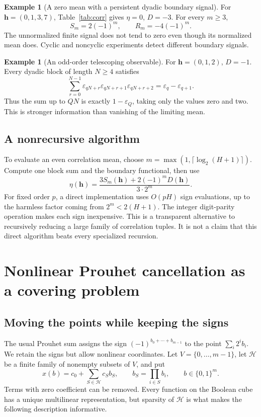 \documentclass[11pt,oneside]{article}
\numberwithin{equation}{section}
\theoremstyle{definition}
\newtheorem{example}[theorem]{Example}
\theoremstyle{remark}
\newcommand{\eps}{\varepsilon}
\newcommand{\HH}{\mathcal H}
\newcommand{\bits}{\{0,1\}}
\begin{document}
\begin{example}[A zero mean with a persistent dyadic boundary signal]
For \(\bm h=(0,1,3,7)\), Table~\ref{tab:corr} gives \(\eta=0\), \(D=-3\).
For every \(m\ge3\),
\[
 S_m=2(-1)^m,\qquad R_m=-4(-1)^m.
\]
The unnormalized finite signal does not tend to zero even though its normalized
mean does. Cyclic and noncyclic experiments detect different boundary signals.
\end{example}

\begin{example}[An odd-order telescoping observable]
For \(\bm h=(0,1,2)\), \(D=-1\). Every dyadic block of length \(N\ge4\)
satisfies
\[
 \sum_{r=0}^{N-1}\eps_{qN+r}\eps_{qN+r+1}\eps_{qN+r+2}
 =\eps_q-\eps_{q+1}.
\]
Thus the sum up to \(QN\) is exactly \(1-\eps_Q\), taking only the values zero
and two. This is stronger information than vanishing of the limiting mean.
\end{example}

\subsection{A nonrecursive algorithm}
To evaluate an even correlation mean, choose
\(m=\max(1,\lceil\log_2(H+1)\rceil)\). Compute one block sum and the
boundary functional, then use
\[
 \eta(\bm h)=\frac{3S_m(\bm h)+2(-1)^mD(\bm h)}{3\cdot2^m}.
\]
For fixed order \(p\), a direct implementation uses \(O(pH)\) sign evaluations,
up to the harmless factor coming from \(2^m<2(H+1)\). The integer digit-parity
operation makes each sign inexpensive. This is a transparent alternative to
recursively reducing a large family of correlation tuples. It is not a claim
that this direct algorithm beats every specialized recursion.

\section{Nonlinear Prouhet cancellation as a covering problem}
\label{sec:hypergraph}

\subsection{Moving the points while keeping the signs}
The usual Prouhet sum assigns the sign \((-1)^{b_0+\cdots+b_{m-1}}\) to the
point \(\sum_i2^ib_i\). We retain the signs but allow nonlinear coordinates.
Let \(V=\{0,\ldots,m-1\}\), let \(\HH\) be a finite family of nonempty subsets
of \(V\), and put
\begin{equation}
 x(b)=c_0+\sum_{S\in\HH}c_S b_S,
 \qquad b_S=\prod_{i\in S}b_i,
 \qquad b\in\bits^m.
 \label{eq:geometry}
\end{equation}
Terms with zero coefficient can be removed. Every function on the Boolean cube
has a unique multilinear representation, but sparsity of \(\HH\) is what makes
the following description informative.
\end{document}
